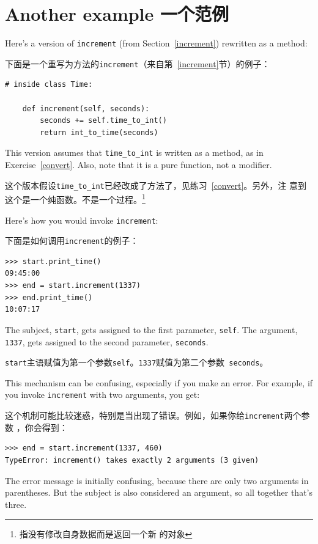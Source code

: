 \documentclass[10pt]{book}
\begin{document}
\begin{CJK}{UTF8}{gbsn}
\begin{exercise}
\end{exercise}


\section{Another example 一个范例}

Here's a version of {\tt increment} (from Section~\ref{increment})
rewritten as a method:

下面是一个重写为方法的{\tt increment}（来自第~\ref{increment}节）的例子：

\begin{verbatim}
# inside class Time:

    def increment(self, seconds):
        seconds += self.time_to_int()
        return int_to_time(seconds)
\end{verbatim}
%
This version assumes that \verb"time_to_int" is written
as a method, as in Exercise~\ref{convert}.  Also, note that
it is a pure function, not a modifier.

这个版本假设\verb"time_to_int"已经改成了方法了，见练习~\ref{convert}。另外，注
意到这个是一个纯函数。不是一个过程。\footnote{指没有修改自身数据而是返回一个新
的对象}

Here's how you would invoke {\tt increment}:

下面是如何调用{\tt increment}的例子：

\begin{verbatim}
>>> start.print_time()
09:45:00
>>> end = start.increment(1337)
>>> end.print_time()
10:07:17
\end{verbatim}
%
The subject, {\tt start}, gets assigned to the first parameter,
{\tt self}.  The argument, {\tt 1337}, gets assigned to the
second parameter, {\tt seconds}.

{\tt start}主语赋值为第一个参数{\tt self}。{\tt 1337}赋值为第二个参数{\tt
seconds}。

This mechanism can be confusing, especially if you make an error.
For example, if you invoke {\tt increment} with two arguments, you
get:

这个机制可能比较迷惑，特别是当出现了错误。例如，如果你给{\tt increment}两个参数
，你会得到：

\begin{verbatim}
>>> end = start.increment(1337, 460)
TypeError: increment() takes exactly 2 arguments (3 given)
\end{verbatim}
%
The error message is initially confusing, because there are
only two arguments in parentheses.  But the subject is also
considered an argument, so all together that's three.


\end{CJK}
\end{document}
